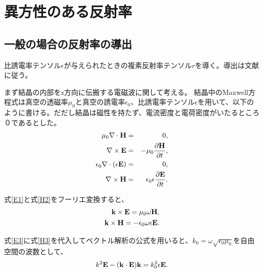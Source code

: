 \section{異方性のある反射率}
\label{sec:reflectance}
\subsection{一般の場合の反射率の導出}
比誘電率テンソル$\epsilon$が与えられたときの複素反射率テンソル$r$を導く。導出は文献\cite{dielectric_tensor_triclinic}に従う。

まず結晶の内部をz方向に伝搬する電磁波に関して考える。
結晶中のMaxwell方程式は真空の透磁率$\mu_0$と真空の誘電率$\epsilon_0$、比誘電率テンソル$\epsilon$を用いて、以下のように書ける。だだし結晶は磁性を持たず、電流密度と電荷密度がいたるところ０であるとした。
\begin{eqnarray}
\label{H1}
\mu_0 \nabla \cdot {\bf H} &=& 0,\\
\label{E1}
\nabla \times {\bf E} &=& -\mu_0 \frac{\partial \bf H}{\partial t},\\
\label{E2}
\epsilon_0 \nabla \cdot  (\epsilon {\bf E}) &=& 0,\\
\label{H2}
\nabla \times {\bf H} &=& \epsilon_0 \epsilon  \frac{\partial \bf E}{ \partial t}.
\end{eqnarray}

式\ref{E1}と式\ref{H2}をフーリエ変換すると、
\begin{eqnarray}
\label{E3}
{\bf k} \times {\bf E} = \mu_0 \omega {\bf H},\\
\label{H3}
{\bf k} \times {\bf H} = -\epsilon_0 \omega  \epsilon  {\bf E}.
\end{eqnarray}

式\ref{E3}に式\ref{H3}を代入してベクトル解析の公式を用いると、$k_0=\omega \sqrt{\epsilon_0 \mu_0}$を自由空間の波数として、
\begin{eqnarray}
\label{kk}
k^2 {\bf E} - ( {\bf k} \cdot {\bf E} ) {\bf k}=  k_0^2  \epsilon {\bf E}.
\end{eqnarray}


